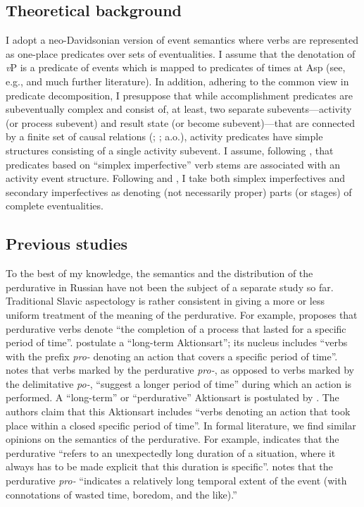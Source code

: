 \documentclass[output=paper,
]{langscibook}
\begin{document}
\subsection{Theoretical background} \label{sec:naumov:3.1}

I adopt a neo-Davidsonian version of event semantics where verbs are represented as one-place predicates over sets of eventualities. I assume that the denotation of \textit{v}P is a predicate of events which is mapped to predicates of times at Asp (see, e.g., \citealt{wolfgang1994time} and much further literature). In addition, adhering to the common view in predicate decomposition, I presuppose that while accomplishment predicates are subeventually complex and consist of, at least, two separate subevents—activity (or process subevent) and result state (or become subevent)—that are connected by a finite set of causal relations (\citealt{dowty1979word}; \citealt{rothstein2004structuring}; a.o.), activity predicates have simple structures consisting of a single activity subevent. I assume, following \citet{pazelskaya2006}, that predicates based on ``simplex imperfective'' verb stems are associated with an activity event structure. Following \citet{altshuler2013,altshuler2014} and \citet{gronn2003semantics, gronn2013}, I take both simplex imperfectives and secondary imperfectives as denoting (not necessarily proper) parts (or stages) of complete eventualities. 

\subsection{Previous studies} \label{sec:naumov:3.2}
To the best of my knowledge, the semantics and the distribution of the perdurative in Russian have not been the subject of a separate study so far. Traditional Slavic aspectology is rather consistent in giving a more or less uniform treatment of the meaning of the perdurative. For example, \cite[243--244]{isacenko1960grammaticeskij} proposes that perdurative verbs denote ``the completion of a process that lasted for a specific period of time''. \cite[16]{bondarko1967} postulate a ``long-term Aktionsart''; its nucleus includes ``verbs with the prefix \textit{pro-} denoting an action that covers a specific period of time''. \cite[23]{forsyth1970grammar} notes that verbs marked by the perdurative \textit{pro-}, as opposed to verbs marked by the delimitative \textit{po-}, ``suggest a longer period of time'' during which an action is performed. A ``long-term'' or ``perdurative'' Aktionsart is postulated by \cite[112--113]{zalizniak2000}. The authors claim that this Aktionsart includes ``verbs denoting an action that took place within a closed specific period of time''. In formal literature, we find similar opinions on the semantics of the perdurative. For example, \cite[26]{gehrke2003aspectual} indicates that the perdurative ``refers to an unexpectedly long duration of a situation, where it always has to be made explicit that this duration is specific''. \cite[32]{filip2005measures} notes that the perdurative \textit{pro-} ``indicates a relatively long temporal extent of the event (with connotations of wasted time, boredom, and the like).'' 
\end{document}
